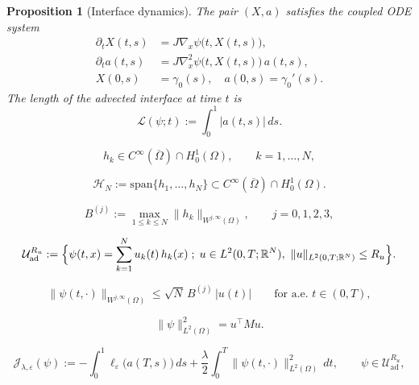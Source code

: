 \documentclass[10pt,a4paper]{amsart}
\newtheorem{prop}{Proposition}
\begin{document}
\begin{prop}[Interface dynamics]\label{prop:interface_ode}
The pair $(X,a)$ satisfies the coupled ODE system
\begin{subequations}\label{eq:state}
\begin{align}
\partial_t X(t,s) &= J\nabla_x \psi\bigl(t,X(t,s)\bigr),\label{eq:state_X}\\
\partial_t a(t,s) &= J\nabla_x^2 \psi\bigl(t,X(t,s)\bigr)\,a(t,s),\label{eq:state_a}\\
X(0,s) &= \gamma_0(s),\quad a(0,s) = \gamma_0'(s).
\end{align}
\end{subequations}
The length of the advected interface at time $t$ is
\begin{equation}\label{eq:length}
\mathcal{L}(\psi;t):=\int_0^1 |a(t,s)|\,ds.
\end{equation}
\end{prop}

\begin{equation}\label{eq:basis_assumption}
h_k\in C^\infty(\overline\Omega)\cap H_0^1(\Omega),\qquad k=1,\dots,N,
\end{equation}

\begin{equation}\label{eq:smooth_space}
\mathcal H_N:=\mathrm{span}\{h_1,\dots,h_N\}\subset C^\infty(\overline\Omega)\cap H_0^1(\Omega).
\end{equation}

\begin{equation}\label{eq:basis_constants}
B^{(j)}:=\max_{1\le k\le N}\|h_k\|_{W^{j,\infty}(\Omega)},\qquad j=0,1,2,3,
\end{equation}

\begin{equation}\label{eq:Uad}
\mathcal U_{\mathrm{ad}}^{R_u}
:=
\Bigl\{
\psi(t,x)=\sum_{k=1}^N u_k(t)\,h_k(x)\;;\;u\in L^2(0,T;\mathbb R^N),\ \|u\|_{L^2(0,T;\mathbb R^N)}\le R_u
\Bigr\}.
\end{equation}

\begin{equation}\label{eq:pt_bound}
\|\psi(t,\cdot)\|_{W^{j,\infty}(\Omega)}\le\sqrt N\,B^{(j)}\,|u(t)|\qquad\text{for a.e. }t\in(0,T),
\end{equation}

\begin{equation}\label{eq:gram_identity}
\|\psi\|_{L^2(\Omega)}^2=u^\top M u.
\end{equation}

\begin{equation}\label{eq:cost}
\mathcal{J}_{\lambda,\varepsilon}(\psi)
:=
-\int_0^1 \ell_\varepsilon\bigl(a(T,s)\bigr)\,ds
+\frac{\lambda}{2}\int_0^T \|\psi(t,\cdot)\|_{L^2(\Omega)}^2\,dt,
\qquad\psi\in\mathcal U_{\mathrm{ad}}^{R_u},
\end{equation}
\end{document}
